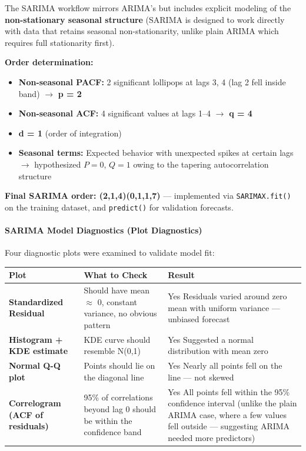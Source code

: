 \documentclass[12pt,openany]{book}
\begin{document}
The SARIMA workflow mirrors ARIMA's but includes explicit modeling of the \textbf{non-stationary seasonal structure} (SARIMA is designed to work directly with data that retains seasonal non-stationarity, unlike plain ARIMA which requires full stationarity first).

\textbf{Order determination:}
\begin{itemize}[leftmargin=*]
    \item \textbf{Non-seasonal PACF:} 2 significant lollipops at lags 3, 4 (lag 2 fell inside band) \(\rightarrow\) \textbf{p = 2}
    \item \textbf{Non-seasonal ACF:} 4 significant values at lags 1--4 \(\rightarrow\) \textbf{q = 4}
    \item \textbf{d = 1} (order of integration)
    \item \textbf{Seasonal terms:} Expected behavior with unexpected spikes at certain lags \(\rightarrow\) hypothesized \(P=0\), \(Q=1\) owing to the tapering autocorrelation structure
\end{itemize}

\textbf{Final SARIMA order: (2,1,4)(0,1,1,7)} --- implemented via \texttt{SARIMAX.fit()} on the training dataset, and \texttt{predict()} for validation forecasts.

\paragraph{SARIMA Model Diagnostics (Plot Diagnostics)}

Four diagnostic plots were examined to validate model fit:

\begin{center}
\begin{tabular}{|L{0.22\textwidth}|L{0.32\textwidth}|L{0.32\textwidth}|}
\hline
Plot & What to Check & Result \\
\hline
\textbf{Standardized Residual} & Should have mean \(\approx\) 0, constant variance, no obvious pattern & Yes Residuals varied around zero mean with uniform variance --- unbiased forecast \\
\hline
\textbf{Histogram + KDE estimate} & KDE curve should resemble N(0,1) & Yes Suggested a normal distribution with mean zero \\
\hline
\textbf{Normal Q-Q plot} & Points should lie on the diagonal line & Yes Nearly all points fell on the line --- not skewed \\
\hline
\textbf{Correlogram (ACF of residuals)} & 95\% of correlations beyond lag 0 should be within the confidence band & Yes All points fell within the 95\% confidence interval (unlike the plain ARIMA case, where a few values fell outside --- suggesting ARIMA needed more predictors) \\
\hline
\end{tabular}
\end{center}
\end{document}
